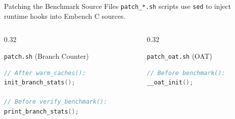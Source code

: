 \documentclass[aspectratio=169, 10pt]{beamer}
\begin{document}
\begin{frame}[fragile]{Patching the Benchmark Source Files}
    \texttt{patch\_*.sh} scripts use \texttt{sed} to inject runtime hooks into Embench C sources.
    \vspace{4pt}
    \begin{columns}[T]
        \begin{column}{0.32\textwidth}
            \begin{defbox}{\texttt{patch.sh} (Branch Counter)}
                \begin{lstlisting}[style=cstyle, language=C]
// After warm_caches():
init_branch_stats();

// Before verify_benchmark():
print_branch_stats();
                \end{lstlisting}
            \end{defbox}
        \end{column}
        \begin{column}{0.32\textwidth}
            \begin{warnbox}{\texttt{patch\_oat.sh} (OAT)}
                \begin{lstlisting}[style=cstyle, language=C]
// Before benchmark():
__oat_init();


\end{lstlisting}
\end{warnbox}
\end{column}
\end{columns}
\end{frame}
\end{document}
